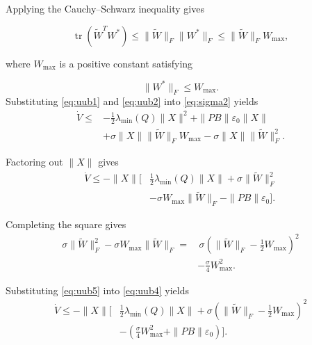 Applying the Cauchy--Schwarz inequality gives

\begin{equation}
	\operatorname{tr}
	\left(
	\tilde{W}^{T}W^{*}
	\right)
	\le
	\|\tilde{W}\|_{F}
	\|W^{*}\|_{F}
	\le
	\|\tilde{W}\|_{F}
	W_{\max},
	\label{eq:uub2}
\end{equation}

where $W_{\max}$ is a positive constant satisfying

\[
\|W^{*}\|_{F}\le W_{\max}.
\]
Substituting \eqref{eq:uub1} and \eqref{eq:uub2} into \eqref{eq:sigma2} yields
\begin{equation}
	\begin{aligned}
		\dot{V} \le & -\frac{1}{2} \lambda_{\min}(Q) \|X\|^{2} + \|PB\| \varepsilon_{0} \|X\| \\
		& + \sigma \|X\| \|\tilde{W}\|_{F} W_{\max} - \sigma \|X\| \|\tilde{W}\|_{F}^{2}.
	\end{aligned}
	\label{eq:uub3}
\end{equation}

Factoring out $\|X\|$ gives
\begin{equation}
	\begin{aligned}
		\dot{V} \le -\|X\| \Big[ & \frac{1}{2} \lambda_{\min}(Q) \|X\| + \sigma \|\tilde{W}\|_{F}^{2} \\
		& - \sigma W_{\max} \|\tilde{W}\|_{F} - \|PB\| \varepsilon_{0} \Big].
	\end{aligned}
	\label{eq:uub4}
\end{equation}

Completing the square gives
\begin{equation}
	\begin{aligned}
		\sigma \|\tilde{W}\|_{F}^{2} - \sigma W_{\max} \|\tilde{W}\|_{F} = & \, \sigma \left( \|\tilde{W}\|_{F} - \frac{1}{2} W_{\max} \right)^{2} \\
		& - \frac{\sigma}{4} W_{\max}^{2}.
	\end{aligned}
	\label{eq:uub5}
\end{equation}

Substituting \eqref{eq:uub5} into \eqref{eq:uub4} yields
\begin{equation}
	\begin{aligned}
		\dot{V} \le -\|X\| \bigg[ & \frac{1}{2} \lambda_{\min}(Q) \|X\| + \sigma \left( \|\tilde{W}\|_{F} - \frac{1}{2} W_{\max} \right)^{2} \\
		& - \left( \frac{\sigma}{4} W_{\max}^{2} + \|PB\| \varepsilon_{0} \right) \bigg].
	\end{aligned}
	\label{eq:uub6}
\end{equation}

